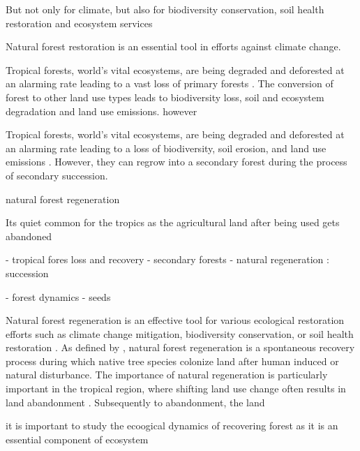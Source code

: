 But not only for climate, but also for biodiversity conservation, soil health restoration and ecosystem services

Natural forest restoration is an essential tool in efforts against climate change.

Tropical forests, world's vital ecosystems, are being degraded and deforested at an alarming rate leading to a vast loss of primary forests \citep{lopez-bedoyaPrimaryForestLoss2022}. The conversion of forest to other land use types leads to biodiversity loss, soil and ecosystem degradation and land use emissions. however

Tropical forests, world's vital ecosystems, are being degraded and deforested at an alarming rate leading to a loss of biodiversity, soil erosion, and land use emissions \citep{lopez-bedoyaPrimaryForestLoss2022}. However, they can regrow into a secondary forest during the process of secondary succession. 

natural forest regeneration 

Its quiet common for the tropics as the agricultural land after being used gets abandoned

- tropical fores loss and recovery
- secondary forests
- natural regeneration : succession

- forest dynamics
- seeds

Natural forest regeneration is an effective tool for various ecological restoration efforts such as climate change mitigation, biodiversity conservation, or soil health restoration \citep{hordijkLandUseHistory2024}. %
As defined by \citet{crouzeillesEcologicalRestorationSuccess2017}, natural forest regeneration is a spontaneous recovery process during which native tree species colonize land after human induced or natural disturbance.
The importance of natural regeneration is particularly important in the tropical region, where shifting land use change often results in land abandonment \citep{chazdonSecondGrowthPromise2014}. Subsequently to abandonment, the land 

it is important to study the ecoogical dynamics of recovering forest as it is an essential component of ecosystem \citep{chazdonNaturalRegenerationTool2016}


